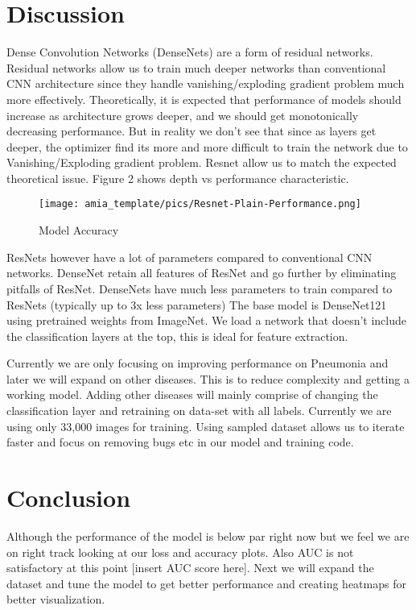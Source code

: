 \documentclass{amia}
\begin{document}
\section*{Discussion}
Dense Convolution Networks (DenseNets) are a form of residual networks. Residual networks allow us to train much deeper networks than conventional CNN architecture since they handle vanishing/exploding gradient problem much more effectively. Theoretically, it is expected that performance of models should increase as architecture grows deeper, and we should get monotonically decreasing performance. But in reality we don't see that since as layers get deeper, the optimizer find its more and more difficult to train the network due to Vanishing/Exploding gradient problem. Resnet allow us to match the expected theoretical issue. Figure 2 shows depth vs performance characteristic.

\begin{figure}[h!]
\centering
\texttt{[image: amia\_template/pics/Resnet-Plain-Performance.png]}
\caption{Model Accuracy}
\label{fig3}
\end{figure}


ResNets however have a lot of parameters compared to conventional CNN networks. DenseNet retain all features of ResNet and go further by eliminating pitfalls of ResNet. DenseNets have much less parameters to train compared to ResNets (typically up to 3x less parameters)
The base model is DenseNet121 using pretrained weights from ImageNet. We load a network that doesn't include the classification layers at the top, this is ideal for feature extraction.

Currently we are only focusing on improving performance on Pneumonia and later we will expand on other diseases. This is to reduce complexity and getting a working model. Adding other diseases will mainly comprise of changing the classification layer and retraining on data-set with all labels. Currently we are using only 33,000  images for training. Using sampled dataset allows us to iterate faster and focus on removing bugs etc in our model and training code.
\section*{Conclusion}

Although the performance of the model is below par right now but we feel we are on right track looking at our loss and accuracy plots. Also AUC is not satisfactory at this point [insert AUC score here]. Next we will expand the dataset and tune the model to get better performance and creating heatmaps for better visualization.
\end{document}
